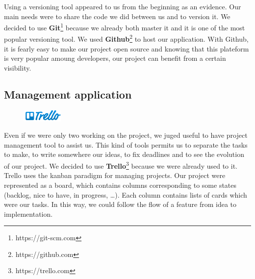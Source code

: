 Using a versioning tool appeared to us from the beginning as an evidence. Our main needs were to share the code we did between us and to version it. We decided to use \textbf{Git}\footnote{https://git-scm.com} because we already both master it and it is one of the most popular versioning tool. We used \textbf{Github}\footnote{https://github.com} to host our application. With Github, it is fearly easy to make our project open source and knowing that this plateform is very popular amoung developers, our project can benefit from a certain visibility.

\subsection{Management application}

\begin{figure}
	\vspace{-5mm}
	\includegraphics[width =2cm]{images/Trello_Logo.png}
\end{figure}


Even if we were only two working on the project, we juged useful to have project management tool to assist us. This kind of tools permits us to separate the tasks to make, to write somewhere our ideas, to fix deadlines and to see the evolution of our project. We decided to use \textbf{Trello}\footnote{https://trello.com} because we were already used to it. Trello uses the kanban paradigm for managing projects. Our project were represented as a board, which contains columns corresponding to some states (backlog, nice to have, in progress, \dots). Each column contains lists of cards which were our tasks. In this way, we could follow the flow of a feature from idea to implementation.

